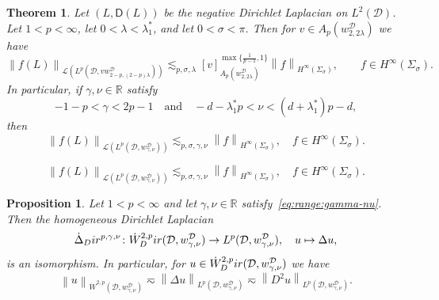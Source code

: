 \documentclass[10pt,a4paper]{amsart}
\newtheorem{theorem}{Theorem}
\newtheorem{proposition}{Proposition}
\newcommand{\Dir}{\textup{Dir}}
\newcommand{\R}{\ensuremath{\mathbb{R}}}
\newcommand{\calD}{\ensuremath{\mathcal{D}}}
\newcommand{\nrm}[1]{\left\lVert #1 \right\rVert}
\newcommand{\sL}{\ensuremath{\mathscr{L}}}
\newcommand{\scrL}{\ensuremath{\mathscr{L}}}
\newcommand{\sfD}{\ensuremath{\mathsf{D}}}
\begin{document}
\begin{theorem}\label{functional:calculus:laplace:wedge:Muckenhoupt}
Let $(L,\sfD(L))$ be the negative Dirichlet Laplacian on $L^2(\calD)$. Let $1<p<\infty$, let $\displaystyle 0<\lambda<\lambda_1^*$, and let $0<\sigma<\pi$. Then for $v\in A_p( w_{2,2\lambda}^\calD)$ we have
\begin{equation}\label{eq:extrapol:ApGeneral}
\nrm{f(L)}_{\scrL(L^p(\calD,v w_{2-p,(2-p)\lambda}^\calD))}
\lesssim_{p,\sigma,\lambda} 
[v]_{A_p( w_{2,2\lambda}^\calD)}^{\max\{\frac{1}{p-1},1\}}\nrm{f}_{H^\infty(\Sigma_\sigma)},\qquad f\in H^\infty(\Sigma_\sigma).
\end{equation}
In particular, if $\gamma,\nu \in\R$ satisfy
\begin{equation}\label{eq:extrapol:range}
-1-p < \gamma < 2p-1\quad\text{and}\quad-d-\lambda_1^*p < \nu < (d+\lambda_1^*)p-d,
\end{equation}
then
\begin{equation}\label{eq:extrapol:ApPower}
\nrm{f(L)}_{\sL(L^p(\calD, w_{\gamma,\nu}^\calD))}\lesssim_{ p,\sigma,\gamma,\nu} \nrm{f}_{H^\infty(\Sigma_\sigma)}, \quad f\in H^\infty(\Sigma_\sigma).
\end{equation}
\end{theorem}

\begin{equation}
\nrm{f(L)}_{\sL(L^p(\calD, w_{\gamma,\nu}^\calD))}\lesssim_{ p,\sigma,\gamma,\nu} \nrm{f}_{H^\infty(\Sigma_\sigma)}, \quad f\in H^\infty(\Sigma_\sigma).
\end{equation}

\begin{proposition}\label{prop:Laplace:hom}
    Let $1<p<\infty$ and let $\gamma,\nu\in\R$ satisfy~\eqref{eq:range:gamma-nu}.
Then the \emph{homogeneous Dirichlet Laplacian}
    \[
    \Dot{\Delta}_\Dir^{p,\gamma,\nu}\colon \Dot{W}^{2,p}_\Dir(\calD,w_{\gamma,\nu}^\calD)\to L^p(\calD,w_{\gamma,\nu}^\calD),\quad u\mapsto\Delta u,
    \]
    is an isomorphism. In particular, for $u\in \Dot{W}^{2,p}_\Dir(\calD,w_{\gamma,\nu}^\calD)$ we have
    \begin{equation}\label{eq:homL:normequiv}
    \nrm{u}_{\Dot{W}^{2,p}(\calD,w_{\gamma,\nu}^\calD)}
    \eqsim
    \nrm{\Delta u}_{L^p(\calD,w_{\gamma,\nu}^\calD)}
    \eqsim
    \nrm{D^2 u}_{L^p(\calD,w_{\gamma,\nu}^\calD)}.
    \end{equation}
\end{proposition}
\end{document}
